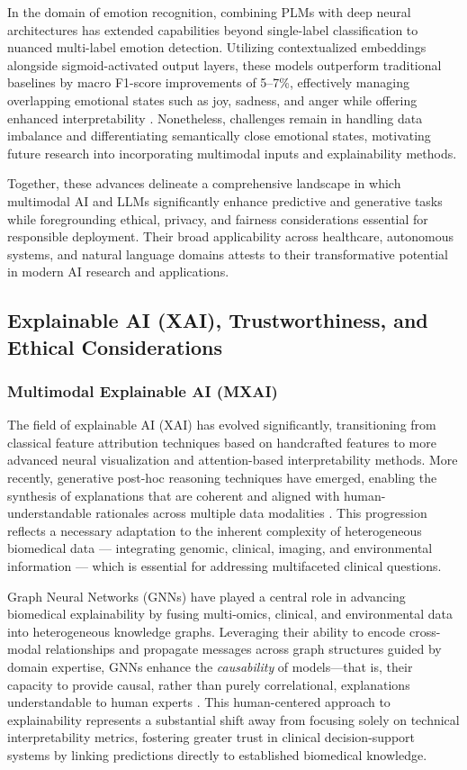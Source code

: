 \documentclass[sigconf]{acmart}
\begin{document}
In the domain of emotion recognition, combining PLMs with deep neural architectures has extended capabilities beyond single-label classification to nuanced multi-label emotion detection. Utilizing contextualized embeddings alongside sigmoid-activated output layers, these models outperform traditional baselines by macro F1-score improvements of 5–7\%, effectively managing overlapping emotional states such as joy, sadness, and anger while offering enhanced interpretability \cite{ref36}. Nonetheless, challenges remain in handling data imbalance and differentiating semantically close emotional states, motivating future research into incorporating multimodal inputs and explainability methods.

Together, these advances delineate a comprehensive landscape in which multimodal AI and LLMs significantly enhance predictive and generative tasks while foregrounding ethical, privacy, and fairness considerations essential for responsible deployment. Their broad applicability across healthcare, autonomous systems, and natural language domains attests to their transformative potential in modern AI research and applications.

\subsection{Explainable AI (XAI), Trustworthiness, and Ethical Considerations}

\subsubsection{Multimodal Explainable AI (MXAI)}

The field of explainable AI (XAI) has evolved significantly, transitioning from classical feature attribution techniques based on handcrafted features to more advanced neural visualization and attention-based interpretability methods. More recently, generative post-hoc reasoning techniques have emerged, enabling the synthesis of explanations that are coherent and aligned with human-understandable rationales across multiple data modalities \cite{ref13,ref24,ref25}. This progression reflects a necessary adaptation to the inherent complexity of heterogeneous biomedical data — integrating genomic, clinical, imaging, and environmental information — which is essential for addressing multifaceted clinical questions.

Graph Neural Networks (GNNs) have played a central role in advancing biomedical explainability by fusing multi-omics, clinical, and environmental data into heterogeneous knowledge graphs. Leveraging their ability to encode cross-modal relationships and propagate messages across graph structures guided by domain expertise, GNNs enhance the \textit{causability} of models—that is, their capacity to provide causal, rather than purely correlational, explanations understandable to human experts \cite{ref24}. This human-centered approach to explainability represents a substantial shift away from focusing solely on technical interpretability metrics, fostering greater trust in clinical decision-support systems by linking predictions directly to established biomedical knowledge.
\end{document}
